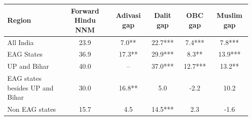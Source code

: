 \begin{tabular}{lccccc}
\hline
Region & Forward Hindu NNM & Adivasi gap & Dalit gap & OBC gap & Muslim gap \\
\hline
All India&23.9&7.0**&22.7***&7.4***&7.8***\\
EAG States&36.9&17.3**&29.9***&8.3**&13.9***\\
UP and Bihar&40.0&--&37.0***&12.7***&13.2**\\
EAG states besides UP and Bihar&30.0&16.8**&5.0&-2.2&10.2\\
Non EAG states&15.7&4.5&14.5***&2.3&-1.6\\
\hline
\end{tabular}
